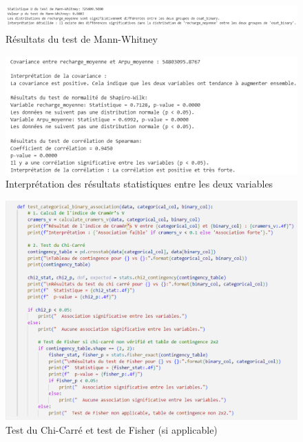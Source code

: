 \begin{figure}[H]
    \centering
    \includegraphics[width=0.8\linewidth]{capture_sas_43.png}
    \caption{Résultats du test de Mann-Whitney}
    \label{AnB5}
\end{figure}



\begin{figure}[H]
    \centering
    \includegraphics[width=0.8\linewidth]{capture_sas_49.png}
    \caption{Interprétation des résultats statistiques entre les deux variables}
    \label{11}
\end{figure}


\vspace{10pt}

\begin{figure}[H]
    \centering
    \includegraphics[width=\textwidth]{capture_sas_13.png}
    \caption{Test du Chi-Carré et test de Fisher (si applicable)}
    \label{222}
\end{figure}
\vspace{10pt}

